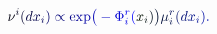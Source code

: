 \documentclass[12pt]{article}
\begin{document}
\makeatletter
\renewcommand*{\@textcolor}[3]{%
  \protect\leavevmode
  \begingroup
    \color#1{#2}#3%
  \endgroup
}
\makeatother
\begin{displaymath}
\mathcolor[RGB]{0,0,15}{\nu} ^ { \mathcolor[RGB]{0,0,30}{i} } \mathcolor[RGB]{0,0,45}{(} \mathcolor[RGB]{0,0,60}{d} \mathcolor[RGB]{0,0,75}{x} _ { \mathcolor[RGB]{0,0,90}{i} } \mathcolor[RGB]{0,0,105}{)} \mathcolor[RGB]{0,0,120}{\propto} \mathrm { \mathcolor[RGB]{0,0,135}{e} \mathcolor[RGB]{0,0,150}{x} \mathcolor[RGB]{0,0,165}{p} } \mathcolor[RGB]{0,0,180}{\big(} \mathcolor[RGB]{0,0,195}{-} \mathcolor[RGB]{0,0,210}{\Phi} _ { \mathcolor[RGB]{0,0,225}{i} } ^ { \mathcolor[RGB]{0,0,240}{r} } \mathcolor[RGB]{0,0,255}{(} \mathcolor[RGB]{0,15,0}{x} _ { \mathcolor[RGB]{0,15,15}{i} } \mathcolor[RGB]{0,15,30}{)} \mathcolor[RGB]{0,15,45}{\big)} \mathcolor[RGB]{0,15,60}{\mu} _ { \mathcolor[RGB]{0,15,75}{i} } ^ { \mathcolor[RGB]{0,15,90}{r} } \mathcolor[RGB]{0,15,105}{(} \mathcolor[RGB]{0,15,120}{d} \mathcolor[RGB]{0,15,135}{x} _ { \mathcolor[RGB]{0,15,150}{i} } \mathcolor[RGB]{0,15,165}{)} \mathcolor[RGB]{0,15,180}{.}
\end{displaymath}
\end{document}

